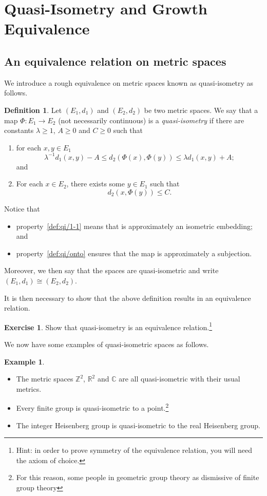 \documentclass[11pt,a4paper,reqno]{amsart}
\theoremstyle{plain}
\theoremstyle{definition}
\newtheorem{definition}[theorem]{Definition}
\theoremstyle{definition}
\newtheorem{exercise}[theorem]{Exercise}
\newtheorem{example}[theorem]{Example}
\renewcommand\leq\leqslant
\renewcommand\geq\geqslant
\begin{document}
\section{Quasi-Isometry and Growth Equivalence}

\subsection{An equivalence relation on metric spaces}

We introduce a rough equivalence on metric spaces known as quasi-isometry as follows.

\begin{definition}
	Let $(E_1,d_1)$ and $(E_2,d_2)$ be two metric spaces.	
	We say that a map $\Phi\colon E_1 \to E_2$ (not necessarily continuous) is a \emph{quasi-isometry} if there are constants $\lambda\geq 1$, $A\geq 0$ and $C\geq 0$ such that
	\begin{enumerate}
		\item\label{def:qi/1-1}
		for each $x,y\in E_1$
		\[
			\lambda^{-1} d_1(x,y) - A
			\leq
			d_2(\Phi(x),\Phi(y))
			\leq
			\lambda d_1(x,y) + A;
		\]
		and
		\item\label{def:qi/onto}
		For each $x\in E_2$, there exists some $y\in E_1$ such that
		\[
		d_2(x,\Phi(y)) \leq C.
		\]
	\end{enumerate}
	Notice that
	\begin{itemize}
		\item property~\ref{def:qi/1-1} means that is approximately an isometric embedding; and
		\item property~\ref{def:qi/onto} ensures that the map is approximately a subjection.
	\end{itemize}
	Moreover, we then say that the spaces are quasi-isometric and write $(E_1,d_1) \cong (E_2,d_2)$.
\end{definition}

It is then necessary to show that the above definition results in an equivalence relation.

\begin{exercise}\label{ex:qi-isequiv}
	Show that quasi-isometry is an equivalence relation.\footnote{Hint: in order to prove symmetry of the equivalence relation, you will need the axiom of choice.}
\end{exercise}

We now have some examples of quasi-isometric spaces as follows.

\begin{example} ~
	
	\begin{itemize}
		\item The metric spaces $\mathbb{Z}^2$, $\mathbb{R}^2$ and $\mathbb{C}$ are all quasi-isometric with their usual metrics.
		\item Every finite group is quasi-isometric to a point.\footnote{For this reason, some people in geometric group theory as dismissive of finite group theory}
		\item The integer Heisenberg group is quasi-isometric to the real Heisenberg group.
	\end{itemize}
\end{example}
\end{document}
